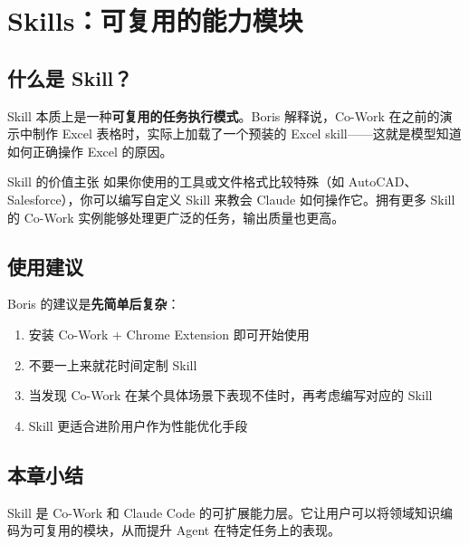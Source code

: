 \section{Skills：可复用的能力模块}

\subsection{什么是 Skill？}

Skill 本质上是一种\textbf{可复用的任务执行模式}。Boris 解释说，Co-Work 在之前的演示中制作 Excel 表格时，实际上加载了一个预装的 Excel skill——这就是模型知道如何正确操作 Excel 的原因。

\begin{importantbox}{Skill 的价值主张}
如果你使用的工具或文件格式比较特殊（如 AutoCAD、Salesforce），你可以编写自定义 Skill 来教会 Claude 如何操作它。拥有更多 Skill 的 Co-Work 实例能够处理更广泛的任务，输出质量也更高。
\end{importantbox}

\subsection{使用建议}

Boris 的建议是\textbf{先简单后复杂}：

\begin{enumerate}
    \item 安装 Co-Work + Chrome Extension 即可开始使用
    \item 不要一上来就花时间定制 Skill
    \item 当发现 Co-Work 在某个具体场景下表现不佳时，再考虑编写对应的 Skill
    \item Skill 更适合进阶用户作为性能优化手段
\end{enumerate}

\subsection{本章小结}

Skill 是 Co-Work 和 Claude Code 的可扩展能力层。它让用户可以将领域知识编码为可复用的模块，从而提升 Agent 在特定任务上的表现。

